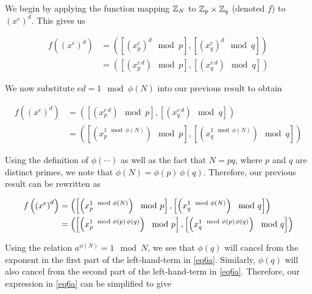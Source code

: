 \documentclass[../CryptoFinal.tex]{subfiles}
\begin{document}
\begin{flushleft}



  We begin by applying the function mapping $\mathbb{Z}_N$ to $\mathbb{Z}_p \times \mathbb{Z}_q$ (denoted $f$) to $\left( x^e \right)^d$.  This gives us

\begin{align*}
  f \left( \left( x^e \right)^d \right) &= \left( \left[ \left( x_p^e \right)^d \mod p \right], \left[ \left( x_q^e \right)^d \mod q \right] \right) \\
  &= \left( \left[ \left( x_p^{e \, d} \right) \mod p \right], \left[ \left( x_q^{e \, d} \right) \mod q \right] \right)
\end{align*}

We now substitute $ed = 1 \mod \phi \left( N \right)$ into our previous result to obtain

\begin{align*}
  f \left( \left( x^e \right)^d \right) &= \left( \left[ \left( x_p^{e \, d} \right) \mod p \right], \left[ \left( x_q^{e \, d} \right) \mod q \right] \right) \\
  &= \left( \left[ \left( x_p^{1 \mod \phi \left( N \right)} \right) \mod p \right], \left[ \left( x_q^{1 \mod \phi \left( N \right)} \right) \mod q \right] \right)
\end{align*}

Using the definition of $\phi \left( \cdots \right)$ as well as the fact that $N = p q$, where $p$ and $q$ are distinct primes, we note that $\phi \left( N \right) = \phi \left( p \right) \, \phi \left( q \right)$.  Therefore, our previous result can be rewritten as

\begin{align}
  f \left( \left( x^e \right)^d \right) &= \left( \left[ \left( x_p^{1 \mod \phi \left( N \right)} \right) \mod p \right], \left[ \left( x_q^{1 \mod \phi \left( N \right)} \right) \mod q \right] \right) \notag \\
  &= \left( \left[ \left( x_p^{1 \mod \phi \left( p \right) \, \phi \left( q \right)} \right) \mod p \right], \left[ \left( x_q^{1 \mod \phi \left( p \right) \, \phi \left( q \right)} \right) \mod q \right] \right) \label{eq6a}
\end{align}

Using the relation $a^{\phi \left( N \right)} = 1 \mod N$, we see that $\phi \left( q \right)$ will cancel from the exponent in the first part of the left-hand-term in \ref{eq6a}.  Similarly, $\phi \left( q \right)$ will also cancel from the second part of the left-hand-term in \ref{eq6a}.  Therefore, our expression in \ref{eq6a} can be simplified to give


\end{flushleft}
\end{document}
